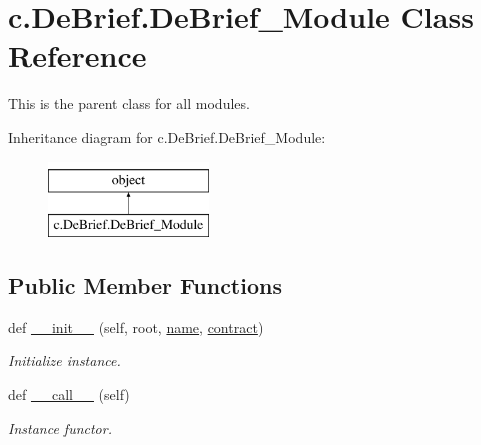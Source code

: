 \hypertarget{classc_1_1_de_brief_1_1_de_brief___module}{}\section{c.\+De\+Brief.\+De\+Brief\+\_\+\+Module Class Reference}
\label{classc_1_1_de_brief_1_1_de_brief___module}


This is the parent class for all modules.  


Inheritance diagram for c.\+De\+Brief.\+De\+Brief\+\_\+\+Module\+:\begin{figure}[H]
\begin{center}
\leavevmode
\includegraphics[height=2.000000cm]{classc_1_1_de_brief_1_1_de_brief___module}
\end{center}
\end{figure}
\subsection*{Public Member Functions}
\begin{DoxyCompactItemize}
\item 
\hypertarget{classc_1_1_de_brief_1_1_de_brief___module_a79a2f393d97acbe594ecfaeb6d0cdb51}{}def \hyperlink{classc_1_1_de_brief_1_1_de_brief___module_a79a2f393d97acbe594ecfaeb6d0cdb51}{\+\_\+\+\_\+init\+\_\+\+\_\+} (self, root, \hyperlink{classc_1_1_de_brief_1_1_de_brief___module_a1893f72f370cbd07d3e048cf60a6b379}{name}, \hyperlink{classc_1_1_de_brief_1_1_de_brief___module_a3c9326a875e28efd0c2a561261225b41}{contract})\label{classc_1_1_de_brief_1_1_de_brief___module_a79a2f393d97acbe594ecfaeb6d0cdb51}

\begin{DoxyCompactList}\small\item\em Initialize instance. \end{DoxyCompactList}\item 
\hypertarget{classc_1_1_de_brief_1_1_de_brief___module_ae4862681c84c459d3485afe4fc7fcf30}{}def \hyperlink{classc_1_1_de_brief_1_1_de_brief___module_ae4862681c84c459d3485afe4fc7fcf30}{\+\_\+\+\_\+call\+\_\+\+\_\+} (self)\label{classc_1_1_de_brief_1_1_de_brief___module_ae4862681c84c459d3485afe4fc7fcf30}

\begin{DoxyCompactList}\small\item\em Instance functor. \end{DoxyCompactList}\end{DoxyCompactItemize}
